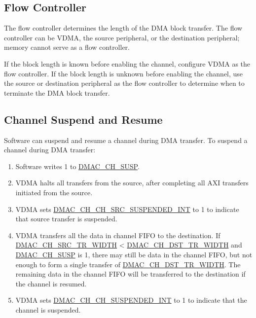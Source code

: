 \documentclass[main\_\_EN.tex]{subfiles}
\begin{document}
\subsection{Flow Controller}

The flow controller determines the length of the DMA block transfer. The flow controller can be VDMA, the source peripheral, or the destination peripheral; memory cannot serve as a flow controller.

If the block length is known before enabling the channel, configure VDMA as the flow controller. If the block length is unknown before enabling the channel, use the source or destination peripheral as the flow controller to determine when to terminate the DMA block transfer.

\subsection{Channel Suspend and Resume}

Software can suspend and resume a channel during DMA transfer. To suspend a channel during DMA transfer:

\begin{enumerate}
    \item Software writes 1 to \hyperref[fielddesc:DMACCH1SUSP]{DMAC\_CH\_SUSP}.
    \item VDMA halts all transfers from the source, after completing all AXI transfers initiated from the source.

    \item VDMA sets \hyperref[int:DMACCHNCHSRCSUSPENDEDINT]{DMAC\_CH\_CH\_SRC\_SUSPENDED\_INT} to 1 to indicate that source transfer is suspended.

    \item VDMA transfers all the data in channel FIFO to the destination. If \hyperref[fielddesc:DMACCHNSRCTRWIDTH]{DMAC\_CH\_SRC\_TR\_WIDTH} < \hyperref[fielddesc:DMACCHNDSTTRWIDTH]{DMAC\_CH\_DST\_TR\_WIDTH} and \hyperref[fielddesc:DMACCH1SUSP]{DMAC\_CH\_SUSP} is 1, there may still be data in the channel FIFO, but not enough to form a single transfer of \hyperref[fielddesc:DMACCHNDSTTRWIDTH]{DMAC\_CH\_DST\_TR\_WIDTH}. The remaining data in the channel FIFO will be transferred to the destination if the channel is resumed.

    \item VDMA sets \hyperref[int:DMACCHNCHSUSPENDEDINT]{DMAC\_CH\_CH\_SUSPENDED\_INT} to 1 to indicate that the channel is suspended.
\end{enumerate}
\end{document}
